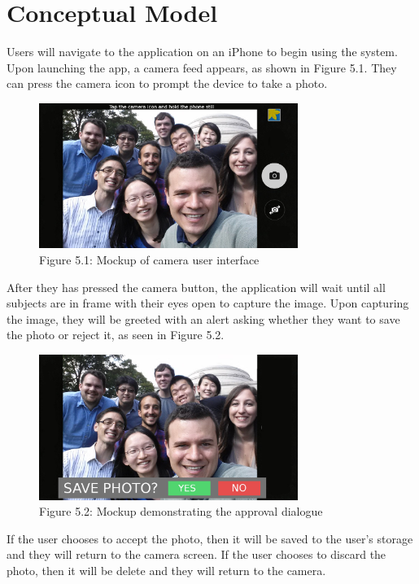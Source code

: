 \chapter{Conceptual Model}

Users will navigate to the application on an iPhone to begin using the system. Upon launching the app, a camera feed appears, as shown in Figure 5.1. They can press the camera icon to prompt the device to take a photo.

\begin{figure}[!h]
    \centering
    \includegraphics[width=0.75\textwidth]{conceptualmodel1}
    \caption{Figure 5.1: Mockup of camera user interface}
    \label{fig:conceptualmodel1}
\end{figure}

After they has pressed the camera button, the application will wait until all subjects are in frame with their eyes open to capture the image. Upon capturing the image, they will be greeted with an alert asking whether they want to save the photo or reject it, as seen in Figure 5.2.

\begin{figure}[!h]
    \centering
    \includegraphics[width=0.75\textwidth]{conceptualmodel2}
    \caption{Figure 5.2: Mockup demonstrating the approval dialogue}
    \label{fig:conceptualmodel2}
\end{figure}

If the user chooses to accept the photo, then it will be saved to the user's storage and they will return to the camera screen. If the user chooses to discard the photo, then it will be delete and they will return to the camera.


